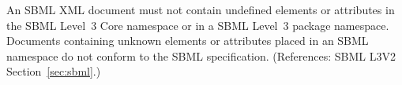 An SBML XML document must not contain undefined elements or attributes in
the SBML Level~3 Core namespace or in a SBML Level~3 package namespace.
Documents containing unknown elements or attributes placed in an SBML
namespace do not conform to the SBML specification.  (References: SBML L3V2
Section~\ref{sec:sbml}.)
